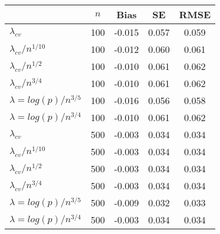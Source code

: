 \documentclass[useAMS,referee,usenatbib]{biom}
\begin{document}
\bgroup
\def\arraystretch{.575}%
    \begin{tabular}{lcccc}
      \hline
      & \textbf{$n$} & \textbf{Bias} & \textbf{SE} & \textbf{RMSE} \\ 
     \hline
        $\lambda_{cv}$ & 100 & -0.015 & 0.057 & 0.059 \\ 
        $\lambda_{cv}/n^{1/10}$ & 100 & -0.012 & 0.060 & 0.061 \\ 
        $\lambda_{cv}/n^{1/2}$ & 100 & -0.010 & 0.061 & 0.062 \\ 
        $\lambda_{cv}/n^{3/4}$ & 100 & -0.010 & 0.061 & 0.062 \\ 
        $\lambda = log(p)/n^{3/5}$ & 100 & -0.016 & 0.056 & 0.058 \\ 
        $\lambda = log(p)/n^{3/4}$ & 100 & -0.010 & 0.061 & 0.062 \\ 
       \hline
       $\lambda_{cv}$ & 500 & -0.003 & 0.034 & 0.034 \\ 
       $\lambda_{cv}/n^{1/10}$ & 500 & -0.003 & 0.034 & 0.034 \\ 
       $\lambda_{cv}/n^{1/2}$ & 500 & -0.003 & 0.034 & 0.034 \\ 
       $\lambda_{cv}/n^{3/4}$ & 500 & -0.003 & 0.034 & 0.034 \\ 
         $\lambda = log(p)/n^{3/5}$ & 500 & -0.009 & 0.032 & 0.033 \\ 
         $\lambda = log(p)/n^{3/4}$ & 500 & -0.003 & 0.034 & 0.034 \\ 
          \hline
    \end{tabular}
\egroup
\end{document}
